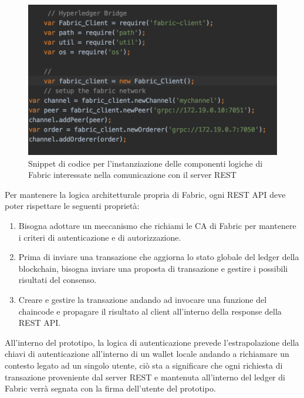 \begin{figure}[h]
    \centering
    \includegraphics[width=1\textwidth]{img/express-comp-fabric.png}
    \caption{Snippet di codice per l'instanziazione delle componenti logiche di Fabric interessate nella comunicazione con il server REST}
    \label{snippet-comp-fabric}
\end{figure}
\newpage
Per mantenere la logica architetturale propria di Fabric, ogni REST API  deve poter rispettare le seguenti proprietà: 
\begin{enumerate}
    \item Bisogna adottare un meccanismo che richiami le CA di Fabric per mantenere i criteri di autenticazione e di autorizzazione.
    \item Prima di inviare una transazione che aggiorna lo stato globale del ledger della blockchain, bisogna inviare una proposta di transazione e gestire i possibili risultati del consenso. 
    \item Creare e gestire la transazione andando ad invocare una funzione del chaincode e propagare il risultato al client all'interno della response della REST API. 
\end{enumerate}
All'interno del prototipo, la logica di autenticazione prevede l'estrapolazione della chiavi di autenticazione all'interno di un wallet locale andando a richiamare un contesto legato ad un singolo utente, ciò sta a significare che ogni richiesta di transazione proveniente dal server REST e mantenuta all'interno del ledger di Fabric verrà segnata con la firma dell'utente del prototipo. 
